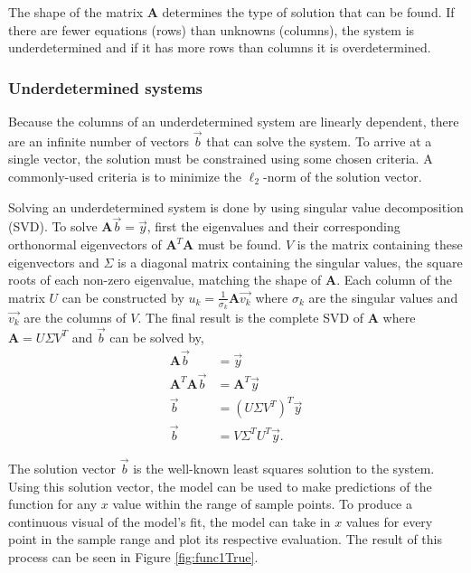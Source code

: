 The shape of the matrix $\mathbf{A}$ determines the type of solution that can be found.  If there are fewer equations (rows) than unknowns (columns), the system is underdetermined and if it has more rows than columns it is overdetermined.  


\subsubsection{Underdetermined systems}
Because the columns of an underdetermined system are linearly dependent, there are an infinite number of vectors $\vec{b}$ that can solve the system.  To arrive at a single vector, the solution must be constrained using some chosen criteria.  A commonly-used criteria is to minimize the $\ell_2$-norm of the solution vector. 

\par Solving an underdetermined system is done by using singular value decomposition (SVD)\cite{linAlg-book}. To solve $\mathbf{A}\vec{b}=\vec{y}$, first the eigenvalues and their corresponding orthonormal eigenvectors of $\mathbf{A}^T\mathbf{A}$ must be found. $V$ is the matrix containing these eigenvectors and $\Sigma$ is a diagonal matrix containing the singular values, the square roots of each non-zero eigenvalue, matching the shape of $\mathbf{A}$. Each column of the matrix $U$ can be constructed by $u_k=\frac{1}{\sigma_k}\mathbf{A}\vec{v_k}$ where $\sigma_k$ are the singular values and $\vec{v_k}$ are the columns of $V$. The final result is the complete SVD of $\mathbf{A}$ where $\mathbf{A}=U\Sigma V^T$ and $\vec{b}$ can be solved by,
\begin{align}
\mathbf{A}\vec{b} &= \vec{y} \label{eq:Aby} \\
\mathbf{A}^T\mathbf{A}\vec{b} &= \mathbf{A}^T\vec{y} \nonumber \\
\vec{b} &= (U\Sigma V^T)^T\vec{y} \nonumber \\
\vec{b} &= V\Sigma^TU^T\vec{y}.
\end{align}

\par The solution vector $\vec{b}$ is the well-known least squares solution to the system. Using this solution vector, the model can be used to make predictions of the function for any $x$ value within the range of sample points. To produce a continuous visual of the model's fit, the model can take in $x$ values for every point in the sample range and plot its respective evaluation. The result of this process can be seen in Figure \ref{fig:func1True}.

